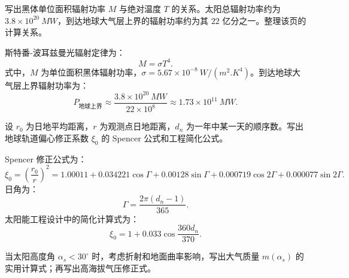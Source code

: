 \begin{problem}\label{exer:calc_04_solar_p015_01}
写出黑体单位面积辐射功率 \(M\) 与绝对温度 \(T\) 的关系。太阳总辐射功率约为 \(3.8 \times 10^{20}\ \unit{MW}\)，到达地球大气层上界的辐射功率约为其 \(22\) 亿分之一。整理该页的计算关系。
\end{problem}

\begin{solution}
斯特番-波耳兹曼光辐射定律为：
\begin{equation}
M = \sigma T^4.
\end{equation}
式中，\(M\) 为单位面积黑体辐射功率，\(\sigma = 5.67 \times 10^{-8}\ \unit{W/(m^2.K^4)}\)。到达地球大气层上界辐射功率为：
\begin{equation}
P_{\text{地球上界}}
\approx \frac{3.8 \times 10^{20}\ \unit{MW}}{22 \times 10^8}
\approx 1.73 \times 10^{11}\ \unit{MW}.
\end{equation}
\end{solution}

\begin{problem}[地球轨道偏心修正系数]\label{exer:calc_04_solar_p024_01}
设 \(r_0\) 为日地平均距离，\(r\) 为观测点日地距离，\(d_n\) 为一年中某一天的顺序数。写出地球轨道偏心修正系数 \(\xi_0\) 的 Spencer 公式和工程简化公式。
\end{problem}

\begin{solution}
Spencer 修正公式为：
\begin{equation}
\xi_0
= \left(\frac{r_0}{r}\right)^2
= 1.00011 + 0.034221\cos\Gamma + 0.00128\sin\Gamma
+ 0.000719\cos2\Gamma + 0.000077\sin2\Gamma.
\end{equation}
日角为：
\begin{equation}
\Gamma = \frac{2\pi(d_n - 1)}{365}.
\end{equation}
太阳能工程设计中的简化计算式为：
\begin{equation}
\xi_0 = 1 + 0.033\cos\frac{360d_n}{370}.
\end{equation}
\end{solution}

\begin{problem}[大气质量计算]\label{exer:calc_04_solar_p028_01}
当太阳高度角 \(\alpha_s < 30^\circ\) 时，考虑折射和地面曲率影响，写出大气质量 \(m(\alpha_s)\) 的实用计算式；再写出高海拔气压修正式。
\end{problem}


